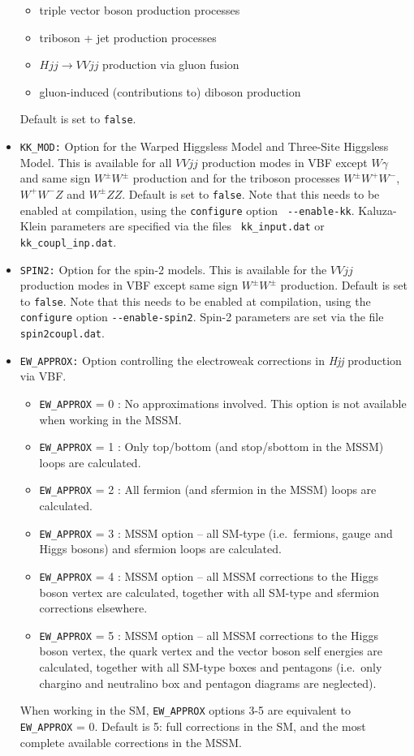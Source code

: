 \documentclass[english,12pt]{article}
\begin{document}
\begin{itemize}
\begin{itemize}
    \item triple vector boson production processes
    \item triboson + jet production processes
    \item $Hjj \rightarrow VV jj$ production via gluon fusion
    \item gluon-induced (contributions to) diboson production
  \end{itemize}
  Default is set to {\tt false}.
\item {\tt KK\_MOD:} Option for the Warped Higgsless Model and Three-Site
Higgsless Model. This is available for all $VVjj$ production modes in VBF except $W\gamma$ and
same sign $W^\pm W^\pm$ production and for the triboson processes $W^\pm W^+W^-$,
$W^+W^-Z$ and $W^\pm ZZ$. Default is set to {\tt false}.  Note that this needs
to be enabled at compilation, using the {\tt configure} option {\tt
-{}-enable-kk}.  Kaluza-Klein parameters are specified via the files {\tt
kk\_input.dat} or {\tt kk\_coupl\_inp.dat}.
\item {\tt SPIN2:} Option for the spin-2 models.  This is available for the
$VVjj$ production modes in VBF except same sign $W^\pm W^\pm$ production.  Default is set
to {\tt false}.  Note that this needs to be enabled at compilation, using the
{\tt configure} option {\tt -{}-enable-spin2}.  Spin-2 parameters are set via
the file {\tt spin2coupl.dat}.
\item {\tt EW\_APPROX:} Option controlling the electroweak corrections in
\textit{Hjj} production via VBF.
  \begin{itemize}
   \item {\tt EW\_APPROX} = 0 : No approximations involved.  This option is not
available when working in the MSSM.
   \item {\tt EW\_APPROX} = 1 : Only top/bottom (and stop/sbottom in the MSSM) loops
are calculated. 
   \item {\tt EW\_APPROX} = 2 : All fermion (and sfermion in the MSSM) loops are
calculated.
   \item {\tt EW\_APPROX} = 3 : MSSM option -- all SM-type (i.e.\ fermions,
gauge and Higgs bosons) and sfermion loops are calculated.
   \item {\tt EW\_APPROX} = 4 : MSSM option -- all MSSM corrections to the Higgs boson
vertex are calculated, together with all SM-type and sfermion corrections
elsewhere.
   \item {\tt EW\_APPROX} = 5 : MSSM option -- all MSSM corrections to the Higgs boson
vertex, the quark vertex and the vector boson self energies are calculated,
together with all SM-type boxes and pentagons (i.e.\ only chargino and
neutralino box and pentagon diagrams are neglected).
  \end{itemize}
  When working in the SM, {\tt EW\_APPROX} options 3-5 are equivalent to {\tt
EW\_APPROX} = 0.  Default is 5: full corrections in the SM, and the most
complete available corrections in the MSSM.
\end{itemize}
\end{document}
